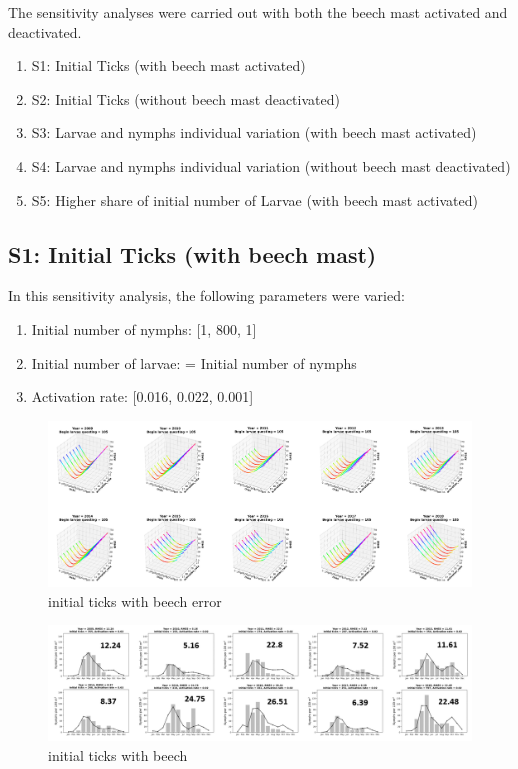\documentclass[a4paper, 11pt]{scrartcl}
\begin{document}
The sensitivity analyses were carried out with both the beech mast activated and deactivated.

\begin{enumerate}
\item S1: Initial Ticks (with beech mast activated)
\item S2: Initial Ticks (without beech mast deactivated)
\item S3: Larvae and nymphs individual variation (with beech mast activated)
\item S4: Larvae and nymphs individual variation (without beech mast deactivated)
\item S5: Higher share of initial number of Larvae (with beech mast activated)
\end{enumerate}


\newpage
\subsection{S1: Initial Ticks (with beech mast)}
In this sensitivity analysis, the following parameters were varied:


\begin{enumerate}
\item Initial number of nymphs: [1, 800, 1]
\item Initial number of larvae: = Initial number of nymphs
\item Activation rate: [0.016, 0.022, 0.001]
\end{enumerate}


\begin{figure}[h!]
\centering
\includegraphics[width=1.0\textwidth]{figures/initial_ticks_with_beech_error.PNG}
\caption{initial ticks with beech error}
\label{fig:initial_ticks_with_beech_error}
\end{figure}

\begin{figure}[h!]
\centering
\includegraphics[width=1.0\textwidth]{figures/initial_ticks_with_beech.PNG}
\caption{initial ticks with beech}
\label{fig:initial_ticks_with_beech}
\end{figure}
\end{document}
